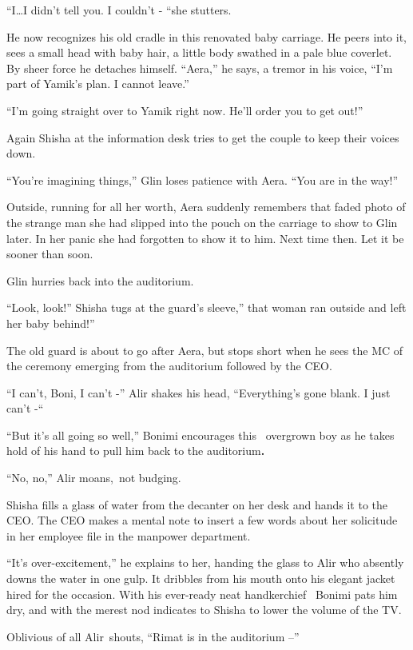 \documentclass[twoside,11pt]{book}
\begin{document}
``I{\dots}I didn't tell you. I couldn't - ``she stutters.

He now recognizes his old cradle in this renovated baby carriage. He peers into it,{ }sees a small head
with baby hair, a little{ }body swathed in a pale blue coverlet. By sheer force
he detaches himself. ``Aera,'' he says, a tremor in his voice, ``I'm part of
Yamik's plan. I cannot leave.''

``I'm going straight over to Yamik right now. He'll order you to get out!''

Again Shisha at the information desk tries to get the couple to keep their voices down.

``You're imagining things,'' Glin loses patience with Aera. ``You are in the
way!''

Outside, running for all her worth, Aera suddenly remembers that faded photo of the strange man she had slipped into the
pouch on the carriage to show to Glin later. In her panic she had forgotten to show it to him. Next time then. Let it
be sooner than soon.

Glin hurries back into the auditorium.

``Look, look!'' Shisha tugs at the guard's sleeve,'' that woman ran outside and
left her baby behind!''

The old guard is about to go after Aera, but stops short when he sees the MC of the ceremony emerging from the
auditorium followed by the CEO.

``I can't, Boni, I can't -'' Alir shakes his head, ``Everything's gone blank. I just can't
-``~

``But it's all going so well,'' Bonimi encourages this {\ }overgrown boy as he
takes hold of his hand to pull him back to the auditorium\textbf{. }

``No, no,'' Alir moans,~not budging.

Shisha fills a glass of water from the decanter on her desk and hands it to the CEO. The CEO makes a mental note to
insert a few words about her solicitude in her employee file in the manpower department.

``It's over-excitement,'' he explains to her, handing the glass to Alir who absently downs the
water in one gulp. It dribbles from his mouth onto his elegant jacket hired for the occasion. With his ever-ready neat
handkerchief \ Bonimi pats him dry, and with the merest nod indicates to Shisha to lower the volume of the TV.

Oblivious of all Alir~shouts, ``Rimat is in the auditorium --''
\end{document}
